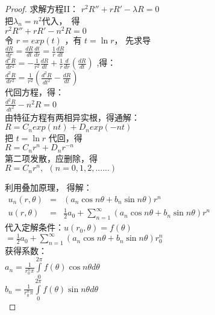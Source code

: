 \begin{proof}
求解方程II：
{$\displaystyle  r^2 R'' +r R' -\lambda R =0 $  } \\ 
把$\lambda_n =n^2 $代入， 得 \\ 
{$\displaystyle  r^2 R'' +r R' -n^2R =0 $  } \\ 
令 $ r=exp(t) $ ，有 $t=\ln r$， 先求导 \\ 
$ \displaystyle \frac{dR}{dr} =\frac{dR}{dt} \frac{dt}{dr} =\frac{1}{r} \frac{dR}{dt} $ \\ 
$ \displaystyle \frac{d^2R}{dr^2} =-\frac{1}{r^2}\frac{dR}{dt} + \frac{1}{r} \frac{d}{dr} (\frac{dR}{dt} )$ ,得：\\ 
$ \displaystyle \frac{d^2R}{dr^2} =\frac{1}{r^2} (\frac{d^2R}{dt^2}-\frac{dR}{dt} )$ \\ 
代回方程，得：\\ 
$ \displaystyle   \frac{d^2R}{dt^2} -n^2 R =0 $ \\ 
由特征方程有两相异实根，得通解：\\ 
$ R=C_nexp(nt)+D_n exp(-nt) $\\
把 $t=\ln r$ 代回，得\\
$R=C_n r^n +D_nr^{-n}$ \\ 
第二项发散，应删除，得\\
$R= C_n r^n,  ~~ (n=0,1,2,......) $		

利用叠加原理， 得解：\\ 
	$\begin{array}{llll}
		u_n(r,\theta) &=& (a_n\cos n\theta +b_n \sin n \theta ) r^n  \\ 
		u(r, \theta) &=& \frac{1}{2} a_0 +\sum_{n=1}^{\infty } (a_n\cos n\theta +b_n \sin n \theta ) r^n
	\end{array}$ \\ 
 代入定解条件：$ u(r_0,\theta)=f (\theta)   $ \\ 
 $ =  \frac{1}{2} a_0 +\sum_{n=1}^{\infty } (a_n\cos n\theta +b_n \sin n \theta ) r_0^n $\\ 
 获得系数：\\ 
   $  \displaystyle  a_n = \frac{1}{r_0 ^n \pi }  \int\limits_{0}^{2\pi} f(\theta) \cos n \theta d\theta $ \\ 
  $  \displaystyle  b_n = \frac{1}{r_0 ^n \pi }  \int\limits_{0}^{2\pi} f(\theta) \sin n \theta d\theta $  \\ 
\end{proof}

